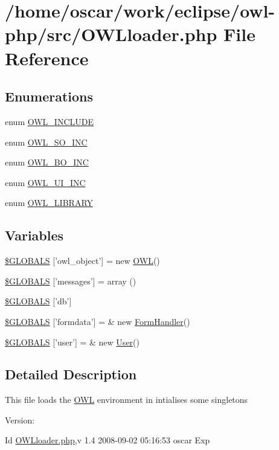 \hypertarget{OWLloader_8php}{
\section{/home/oscar/work/eclipse/owl-php/src/OWLloader.php File Reference}
\label{OWLloader_8php}
}
\subsection*{Enumerations}
\begin{CompactItemize}
\item 
enum \hyperlink{OWLloader_8php_4d33a8f2fcc9c83cbeea921c4cb23a7f}{OWL\_\-INCLUDE} 
\item 
enum \hyperlink{OWLloader_8php_75dffdef5ba58a0ba5f21ed40627897f}{OWL\_\-SO\_\-INC} 
\item 
enum \hyperlink{OWLloader_8php_ca50646bc73c3addf0e0f25081eae0ae}{OWL\_\-BO\_\-INC} 
\item 
enum \hyperlink{OWLloader_8php_2e11101c70f011a91d0d9c7f8e217738}{OWL\_\-UI\_\-INC} 
\item 
enum \hyperlink{OWLloader_8php_74eed08508c8b70677c4167acf49e427}{OWL\_\-LIBRARY} 
\end{CompactItemize}
\subsection*{Variables}
\begin{CompactItemize}
\item 
\hyperlink{OWLloader_8php_b1ba2f4786a45be835910188036c4cf3}{\$GLOBALS} \mbox{[}'owl\_\-object'\mbox{]} = new \hyperlink{classOWL}{OWL}()
\item 
\hyperlink{OWLloader_8php_65f2996116eed36e9ab25f254a470259}{\$GLOBALS} \mbox{[}'messages'\mbox{]} = array ()
\item 
\hyperlink{OWLloader_8php_14159e18d9b64fd1e16054f784eda311}{\$GLOBALS} \mbox{[}'db'\mbox{]}
\item 
\hyperlink{OWLloader_8php_8589ac46db5e9bbb32368635933c4b42}{\$GLOBALS} \mbox{[}'formdata'\mbox{]} = \& new \hyperlink{classFormHandler}{FormHandler}()
\item 
\hyperlink{OWLloader_8php_6ca8a3deb7e1b32adc92d8cb72617832}{\$GLOBALS} \mbox{[}'user'\mbox{]} = \& new \hyperlink{classUser}{User}()
\end{CompactItemize}


\subsection{Detailed Description}
This file loads the \hyperlink{classOWL}{OWL} environment in intialises some singletons \begin{Desc}
\item[Version:]\end{Desc}
\begin{Desc}
\item[Id]\hyperlink{OWLloader_8php}{OWLloader.php},v 1.4 2008-09-02 05:16:53 oscar Exp \end{Desc}


